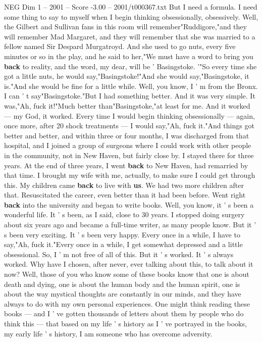 \begin{textsample}{NEG Dim 1 – 2001 – Score -3.00 – 2001/t000367.txt}
But I need a formula.
I need some thing to say to myself when I begin thinking obsessionally, obsessively.
Well, the Gilbert and Sullivan fans in this room will remember"Ruddigore,"and they will remember Mad Margaret, and they will remember that she was married to a fellow named Sir Despard Murgatroyd.
And she used to go nuts, every five minutes or so in the play, and he said to her,"We must have a word to bring you \textbf{back} to reality, and the word, my dear, will be ' Basingstoke. '"So every time she got a little nuts, he would say,"Basingstoke!"And she would say,"Basingstoke, it is."And she would be fine for a little while.
Well, you know, I ' m from the Bronx.
I can ' t say"Basingstoke."But I had something better.
And it was very simple.
It was,"Ah, fuck it!"Much better than"Basingstoke,"at least for me.
And it worked — my God, it worked.
Every time I would begin thinking obsessionally — again, once more, after 20 shock treatments — I would say,"Ah, fuck it."And things got better and better, and within three or four months, I was discharged from that hospital, and I joined a group of surgeons where I could work with other people in the community, not in New Haven, but fairly close by.
I stayed there for three years.
At the end of three years, I went \textbf{back} to New Haven, had remarried by that time.
I brought my wife with me, actually, to make sure I could get through this.
My children came \textbf{back} to live with \textbf{us}.
We had two more children after that.
Resuscitated the career, even better than it had been before.
Went right \textbf{back} into the university and began to write books.
Well, you know, it ' s been a wonderful life.
It ' s been, as I said, close to 30 years.
I stopped doing surgery about six years ago and became a full-time writer, as many people know.
But it ' s been very exciting.
It ' s been very happy.
Every once in a while, I have to say,"Ah, fuck it."Every once in a while, I get somewhat depressed and a little obsessional.
So, I ' m not free of all of this.
But it ' s worked.
It ' s always worked.
Why have I chosen, after never, ever talking about this, to talk about it now?
Well, those of you who know some of these books know that one is about death and dying, one is about the human body and the human spirit, one is about the way mystical thoughts are constantly in our minds, and they have always to do with my own personal experiences.
One might think reading these books — and I ' ve gotten thousands of letters about them by people who do think this — that based on my life ' s history as I ' ve portrayed in the books, my early life ' s history, I am someone who has overcome adversity.

\end{textsample}
